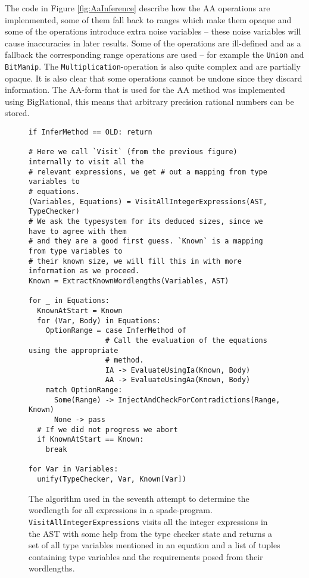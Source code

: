The code in Figure \ref{fig:AaInference} describe how the AA operations are implenmented, some of them fall back to ranges which make them opaque and some of the operations introduce extra noise variables -- these noise variables will cause inaccuracies in later results. Some of the operations are ill-defined and as a fallback the corresponding range operations are used -- for example the \verb+Union+ and \verb+BitManip+. The \verb+Multiplication+-operation is also quite complex and are partially opaque. It is also clear that some operations cannot be undone since they discard information. The AA-form that is used for the AA method was implemented using BigRational, this means that arbitrary precision rational numbers can be stored. 

\begin{figure}[h!]
\begin{verbatim}
if InferMethod == OLD: return

# Here we call `Visit` (from the previous figure) internally to visit all the
# relevant expressions, we get # out a mapping from type variables to
# equations.
(Variables, Equations) = VisitAllIntegerExpressions(AST, TypeChecker)
# We ask the typesystem for its deduced sizes, since we have to agree with them
# and they are a good first guess. `Known` is a mapping from type variables to
# their known size, we will fill this in with more information as we proceed.
Known = ExtractKnownWordlengths(Variables, AST)

for _ in Equations:
  KnownAtStart = Known
  for (Var, Body) in Equations:
    OptionRange = case InferMethod of
                  # Call the evaluation of the equations using the appropriate
                  # method.
                  IA -> EvaluateUsingIa(Known, Body)
                  AA -> EvaluateUsingAa(Known, Body)
    match OptionRange:
      Some(Range) -> InjectAndCheckForContradictions(Range, Known)
      None -> pass
  # If we did not progress we abort
  if KnownAtStart == Known:
    break

for Var in Variables:
  unify(TypeChecker, Var, Known[Var])
\end{verbatim}
  \cprotect\caption{The algorithm used in the seventh attempt to determine the wordlength for all expressions in a spade-program. \verb+VisitAllIntegerExpressions+ visits all the integer expressions in the AST with some help from the type checker state and returns a set of all type variables mentioned in an equation and a list of tuples containing type variables and the requirements posed from their wordlengths.}
\label{fig:WLIAlgo}
\end{figure}

